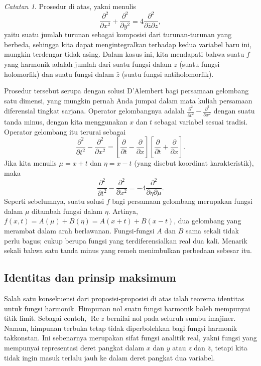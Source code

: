 \documentclass[12pt,openany]{book}
\renewcommand{\Re}{\operatorname{Re}}
\theoremstyle{plain}
\theoremstyle{remark}
\newtheorem{remark}[thm]{Catatan}
\theoremstyle{definition}
\theoremstyle{exercise}
\theoremstyle{example}
\begin{document}
\begin{remark}
Prosedur di atas, yakni menulis
\begin{equation*}
\frac{\partial^2}{\partial x^2}+ \frac{\partial^2}{\partial y^2} =
4 \frac{\partial^2}{\partial \bar{z} \partial z} ,
\end{equation*}
yaitu suatu jumlah turunan sebagai komposisi dari
turunan-turunan yang berbeda,
sehingga kita dapat mengintegralkan terhadap kedua variabel baru ini, mungkin
terdengar tidak asing. Dalam kasus ini, kita mendapati bahwa suatu $f$ yang harmonik adalah jumlah dari suatu fungsi
dalam $z$ (suatu fungsi holomorfik) dan suatu fungsi dalam $\bar{z}$ (suatu
fungsi antiholomorfik).

Prosedur tersebut serupa dengan solusi D'Alembert bagi persamaan gelombang satu dimensi,
yang mungkin pernah Anda jumpai dalam mata kuliah persamaan diferensial tingkat sarjana.
Operator gelombangnya adalah
$\frac{\partial^2}{\partial t^2}- \frac{\partial^2}{\partial x^2}$ dengan suatu
tanda minus, dengan kita menggunakan $x$ dan $t$ sebagai variabel sesuai tradisi.
Operator gelombang itu terurai sebagai
\begin{equation*}
\frac{\partial^2}{\partial t^2}- \frac{\partial^2}{\partial x^2}
=
\left[ \frac{\partial}{\partial t}- \frac{\partial}{\partial x}
\right]
\left[ \frac{\partial}{\partial t}+ \frac{\partial}{\partial x}
\right] .
\end{equation*}
Jika kita menulis $\mu = x+t$ dan $\eta = x-t$
(yang disebut koordinat karakteristik), maka
\begin{equation*}
\frac{\partial^2}{\partial t^2}- \frac{\partial^2}{\partial x^2}
=
-4 \frac{\partial^2}{\partial \eta \partial \mu} .
\end{equation*}
Seperti sebelumnya, suatu solusi $f$ bagi persamaan gelombang merupakan fungsi
dalam $\mu$ ditambah fungsi dalam $\eta$. Artinya, $f(x,t) = A(\mu) + B(\eta) =
A(x+t)+B(x-t)$, dua gelombang yang merambat dalam arah berlawanan. Fungsi-fungsi
$A$ dan $B$ sama sekali tidak perlu bagus; cukup berupa fungsi yang terdiferensialkan real
dua kali.
Menarik sekali bahwa satu tanda minus yang remeh menimbulkan perbedaan sebesar itu.
\end{remark}

\subsection{Identitas dan prinsip maksimum}

Salah satu konsekuensi dari proposisi-proposisi di atas ialah teorema identitas
untuk fungsi harmonik.
Himpunan nol suatu fungsi harmonik boleh mempunyai titik limit.
Sebagai contoh, $\Re z$ bernilai nol pada seluruh sumbu
imajiner. Namun, himpunan terbuka tetap tidak diperbolehkan bagi fungsi harmonik
takkonstan. Ini sebenarnya merupakan sifat fungsi analitik real, yakni
fungsi yang mempunyai representasi deret pangkat dalam $x$ dan $y$
atau $z$ dan $\bar{z}$, tetapi kita tidak ingin masuk terlalu jauh ke dalam deret pangkat dua
variabel.
\end{document}
